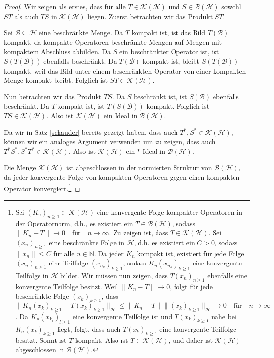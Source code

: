 \documentclass[11pt, hidelinks]{article}
\newcommand{\h}{\mathcal{H}}
\numberwithin{conj}{section}
\begin{document}
\begin{proof}
Wir zeigen als erstes, dass für alle $T \in \mathcal{K}(\mathcal{H})$ und $S \in \mathcal{B}(\mathcal{H})$ sowohl $ST$ als auch $TS$ in $\mathcal{K}(\mathcal{H})$ liegen. Zuerst betrachten wir das Produkt $ST$.

Sei $\mathcal{B} \subseteq \mathcal{H}$ eine beschränkte Menge. Da $T$ kompakt ist, ist das Bild $T(\mathcal{B})$ kompakt, da kompakte Operatoren beschränkte Mengen auf Mengen mit kompaktem Abschluss abbilden. Da $S$ ein beschränkter Operator ist, ist $S(T(\mathcal{B}))$ ebenfalls beschränkt. Da $T(\mathcal{B})$ kompakt ist, bleibt $S(T(\mathcal{B}))$ kompakt, weil das Bild unter einem beschränkten Operator von einer kompakten Menge kompakt bleibt. Folglich ist $ST \in \mathcal{K}(\mathcal{H})$.

Nun betrachten wir das Produkt $TS$. Da $S$ beschränkt ist, ist $S(\mathcal{B})$ ebenfalls beschränkt. Da $T$ kompakt ist, ist $T(S(\mathcal{B}))$ kompakt. Folglich ist $TS \in \mathcal{K}(\mathcal{H})$. Also ist $\mathcal{K}(\mathcal{H})$ ein Ideal in $\mathcal{B}(\mathcal{H})$.

Da wir in Satz \ref{schauder} bereits gezeigt haben, dass auch $T^\ast, S^\ast \in \mathcal{K}(\mathcal{H})$, können wir ein analoges Argument verwenden um zu zeigen, dass auch $T^\ast S^\ast, S^\ast T^\ast \in \mathcal{K}(\mathcal{H})$. Also ist $\mathcal{K}(\mathcal{H})$ ein $\ast$-Ideal in $\mathcal{B}(\mathcal{H})$.

Die Menge $\mathcal{K}(\mathcal{H})$ ist abgeschlossen in der normierten Struktur von $\mathcal{B}(\mathcal{H})$, da jeder konvergente Folge von kompakten Operatoren gegen einen kompakten Operator konvergiert.\footnote{Sei \((K_n)_{n\geq 1} \subset \mathcal{K}(\mathcal{H})\) eine konvergente Folge kompakter Operatoren in der Operatornorm, d.h., es existiert ein \(T \in \mathcal{B}(\mathcal{H})\), sodass $\|K_n - T\| \to 0 \quad \text{für} \quad n \to \infty$. Zu zeigen ist, dass \(T \in \mathcal{K}(\mathcal{H})\). Sei \((x_n)_{n\geq 1}\) eine beschränkte Folge in \(\mathcal{H}\), d.h. es existiert ein \(C > 0\), sodass \(\|x_n\| \leq C\) für alle \(n \in \mathbb{N}\). Da jeder \(K_n\) kompakt ist, existiert für jede Folge \((x_n)_{n\geq 1}\) eine Teilfolge \((x_{n_k})_{k\geq 1}\), sodass \(K_n(x_{n_k})_{k\geq 1}\) eine konvergente Teilfolge in \(\mathcal{H}\) bildet. Wir müssen nun zeigen, dass \(T(x_n)_{n\geq 1}\) ebenfalls eine konvergente Teilfolge besitzt. Weil \(\|K_n - T\| \to 0\), folgt für jede beschränkte Folge \((x_k)_{k\geq 1}\), dass $\|K_n(x_k)_{k\geq 1} - T(x_k)_{k\geq 1}\|_\h \leq \|K_n - T\| \|(x_k)_{k\geq 1}\|_\h \to 0 \quad \text{für} \quad n \to \infty$. Da \(K_n(x_{k_l})_{l\geq 1}\) eine konvergente Teilfolge ist und \(T(x_k)_{k\geq 1}\) nahe bei \(K_n(x_k)_{k\geq 1}\) liegt, folgt, dass auch \(T(x_k)_{k\geq 1}\) eine konvergente Teilfolge besitzt. Somit ist \(T\) kompakt. Also ist \(T \in \mathcal{K}(\mathcal{H})\), und daher ist \(\mathcal{K}(\mathcal{H})\) abgeschlossen in \(\mathcal{B}(\mathcal{H})\).}


\end{proof}
\end{document}
